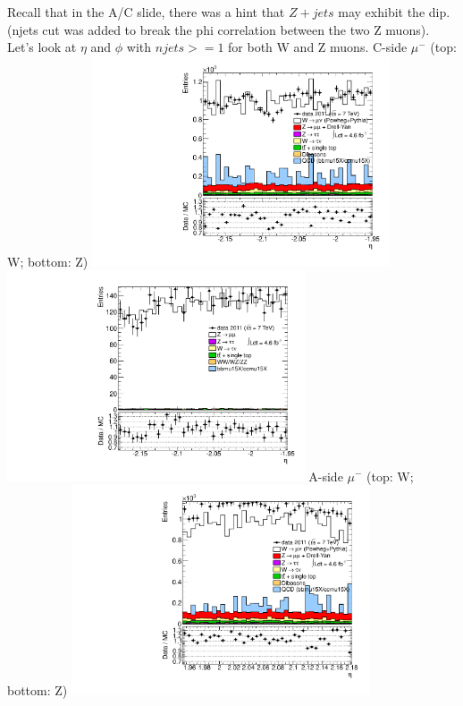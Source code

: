  {
Recall that in the A/C slide, there was a hint that $Z+jets$ may exhibit the dip. \\
(njets cut was added to break the phi correlation between the two Z muons).
Let's look at $\eta$ and $\phi$ with $njets>=1$ for both W and Z muons.
}
 {
\colb[T]
C-side $\mu^{-}$ (top: W; bottom: Z)
\centering
\includegraphics[width=0.66\textwidth]{dates/20130306/figures/etaphi/Wnjets_10_C_stack_l_eta_NEG} \\
\includegraphics[width=0.66\textwidth]{dates/20130306/figures/etaphi/Znjets_10_C_stack_lN_eta_ALL.pdf}
A-side $\mu^{-}$ (top: W; bottom: Z)
\centering
\includegraphics[width=0.66\textwidth]{dates/20130306/figures/etaphi/Wnjets_10_A_stack_l_eta_NEG} \\
}
